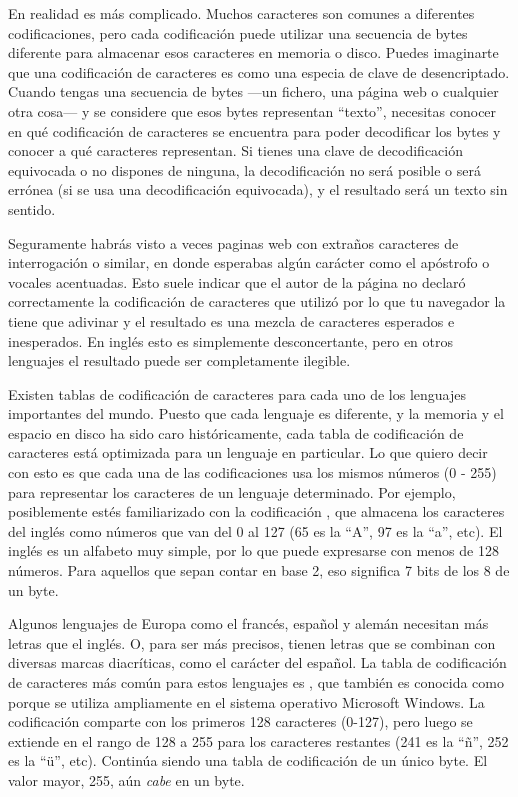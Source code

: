 En realidad es más complicado. Muchos caracteres son comunes a diferentes codificaciones, pero cada codificación puede utilizar una secuencia de bytes diferente para almacenar esos caracteres en memoria o disco. Puedes imaginarte que una codificación de caracteres es como una especia de clave de desencriptado. Cuando tengas una secuencia de bytes ---un fichero, una página web o cualquier otra cosa--- y se considere que esos bytes representan ``texto'', necesitas conocer en qué codificación de caracteres se encuentra para poder decodificar los bytes y conocer a qué caracteres representan. Si tienes una clave de decodificación equivocada o no dispones de ninguna, la decodificación no será posible o será errónea (si se usa una decodificación equivocada), y el resultado será un texto sin sentido.


Seguramente  habrás visto a veces paginas web con extraños caracteres de interrogación o similar, en donde esperabas algún carácter como el apóstrofo o vocales acentuadas. Esto suele indicar que el autor de la página no declaró correctamente la codificación de caracteres que utilizó por lo que tu navegador la tiene que adivinar y el resultado es una mezcla de caracteres esperados e inesperados. En inglés esto es simplemente desconcertante, pero en otros lenguajes el resultado puede ser completamente ilegible.

Existen tablas de codificación de caracteres para cada uno de los lenguajes importantes del mundo. Puesto que cada lenguaje es diferente, y la memoria y el espacio en disco ha sido caro históricamente, cada tabla de codificación de caracteres está optimizada para un lenguaje en particular. Lo que quiero decir con esto es que cada una de las codificaciones usa los mismos números (0 - 255) para representar los caracteres de un lenguaje determinado. Por ejemplo, posiblemente estés familiarizado con la codificación , que almacena los caracteres del inglés como números que van del 0 al 127 (65 es la ``A'', 97 es la ``a'', etc). El inglés es un alfabeto muy simple, por lo que puede expresarse con menos de 128 números. Para aquellos que sepan contar en base 2, eso significa 7 bits de los 8 de un byte.

Algunos lenguajes de Europa como el francés, español y alemán necesitan más letras que el inglés. O, para ser más precisos, tienen letras que se combinan con diversas marcas diacríticas, como el carácter  del español. La tabla de codificación de caracteres más común para estos lenguajes es , que también es conocida como  porque se utiliza ampliamente en el sistema operativo Microsoft Windows. La codificación  comparte con  los primeros 128 caracteres (0-127), pero luego se extiende en el rango de 128 a 255 para los caracteres restantes (241 es la ``ñ'', 252 es la ``ü'', etc). Continúa siendo una tabla de codificación de un único byte. El valor mayor, 255, aún \emph{cabe} en un byte.

